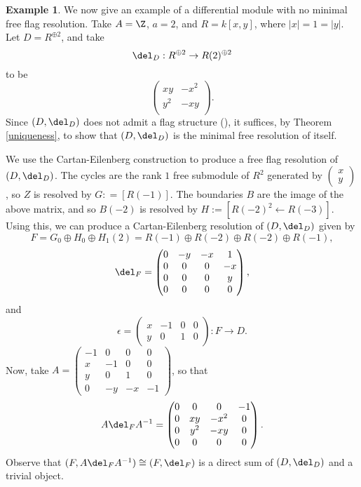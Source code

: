 \documentclass[12pt]{amsart}
\theoremstyle{definition}
\newtheorem{example}[lemma]{Example}
\theoremstyle{remark}
\begin{document}
\begin{example}
\label{DNE}
We now give an example of a differential module with no minimal free flag resolution. Take $A = \Z$, $a = 2$, and $R = k[x, y]$, where $|x| = 1 = |y|$. Let $D = R^{\oplus 2}$, and take
$$
\del_D : R^{\oplus 2} \to R(2)^{\oplus 2}
$$
to be
$$
\begin{pmatrix}
xy & -x^2 \\
y^2 & -xy\\
\end{pmatrix}.
$$
Since $(D, \del_D)$ does not admit a flag structure (\cite{ABI}), it suffices, by Theorem \ref{uniqueness}, to show that $(D, \del_D)$ is the minimal free resolution of itself. 

We use the Cartan-Eilenberg construction to produce a free flag resolution of $(D,\del_D)$.  The cycles are the rank $1$ free submodule of $R^2$ generated by $\begin{pmatrix} x \\ y \end{pmatrix}$, so $Z$ is resolved by $G: = [R(-1)]$.  The boundaries $B$ are the image of the above matrix, and so $B(-2)$ is resolved by $H:=[R(-2)^2 \gets R(-3)]$.  Using this, we can produce a Cartan-Eilenberg resolution
 of $(D, \del_D)$ given by
$$
F = G_0\oplus H_0 \oplus H_1(2) = R(-1) \oplus R(-2) \oplus R(-2) \oplus R(-1),
$$
$$
\del_F = \begin{pmatrix} 0 & -y & -x & 1 \\ 0 & 0 & 0 & -x \\ 0 & 0 & 0 & y \\ 0 & 0 & 0 & 0 \end{pmatrix},
$$
and
$$
\epsilon = \begin{pmatrix} x &  -1 & 0 & 0 \\ y & 0 & 1 & 0 \end{pmatrix}: F \to D.
$$
Now, take $A = \begin{pmatrix} -1 & 0 & 0 & 0 \\ x & -1 & 0 & 0 \\ y & 0 & 1 & 0 \\ 0 & -y & -x & -1\end{pmatrix}$, so that
$$
A \del_F A^{-1} = \begin{pmatrix} 0 & 0 & 0 & -1 \\ 0 & xy&-x^2&0 \\ 0 & y^2 & -xy&0 \\ 0 & 0 & 0 & 0 \end{pmatrix}.
$$
Observe that $(F, A\del_F A^{-1}) \cong (F, \del_F)$ is a direct sum of $(D, \del_D)$ and a trivial object.

\end{example}
\end{document}
